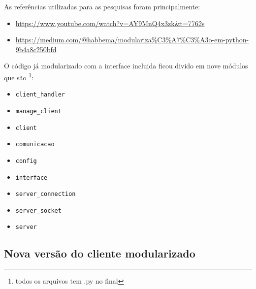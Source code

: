	As referências utilizadas para as pesquisas foram principalmente:
	
	\begin{itemize}
		\item \url{https://www.youtube.com/watch?v=AY9MnQ4x3zk&t=7762s}
		\item \url{https://medium.com/@habbema/modulariza%C3%A7%C3%A3o-em-python-9b4a8c250bfd}
	\end{itemize}  
	
	O código já modularizado com a interface incluida ficou divido em nove módulos que são \footnote{todos os arquivos tem .py no final}:
	
	\begin{itemize}
		\item \texttt{client\_handler}
		\item \texttt{manage\_client}
		\item \texttt{client}
		\item \texttt{comunicacao}
		\item \texttt{config}
		\item \texttt{interface}
		\item \texttt{server\_connection}
		\item \texttt{server\_socket}
		\item \texttt{server}
	\end{itemize}
	
	
	
	\subsection*{Nova versão do cliente modularizado}
	
